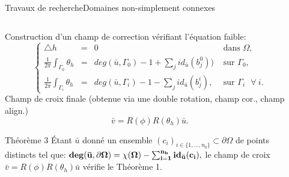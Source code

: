 \documentclass[compress,10pt,aspectratio=169]{beamer}
\begin{document}
\begin{frame}{Travaux de recherche}{Domaines non-simplement connexes}
\small
\begin{columns}
\begin{column}{0.68\textwidth}
Construction d'un champ de correction vérifiant l'équation faible:%
\begin{equation*}
\left\{
\begin{array}{lcll}
    \triangle h &= &0 &\mbox{ dans }\Omega,\\[0.025cm]
    \displaystyle\frac{1}{2\pi}\int_{\Gamma_0}\theta_h &=& deg(\bar{u}, \Gamma_0)-1+\sum_j id_{\bar{u}}(b_j^0))&\mbox{ sur } \Gamma_0,\\[0.025cm]
    \displaystyle\frac{1}{2\pi}\int_{\Gamma_i}\theta_h& =& deg(\bar{u}, \Gamma_i)-1-\sum_j id_{\bar{u}}(b_j^i),&\mbox{ sur }\Gamma_i~~~\forall~i.
\end{array}
\right.
\end{equation*}
Champ de croix finale {\color{onera_gray} (obtenue via une double rotation, champ cor., champ align.)}
\begin{equation*}
\bar{v}=R(\phi)R(\theta_h)\bar{u}.
\end{equation*}
\begin{onerablock}{
\small Théorème 3}
\'Etant $\bar{u}$ donné un ensemble $(c_i)_{i\in\{1,\dots,n_b\}}\subset\partial\Omega$ de points distincts tel que:
$
{\bf deg(\bar{u}, \partial\Omega) = \chi(\Omega)-\sum_{i=1}^{n_b} id_{\bar{u}}(c_i),}
$
le champ de croix $\bar{v}=R(\phi)R(\theta_h)\bar{u}$ vérifie le Théorème 1.
\end{onerablock}
\end{column}
\begin{column}{0.32\textwidth}
\centering

\end{column}
\end{columns}
\end{frame}
\end{document}
